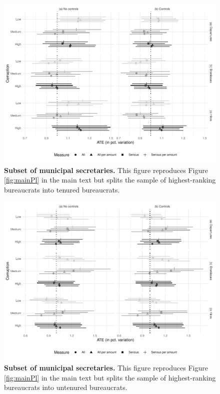 \documentclass[12pt,a4paper]{article}
\theoremstyle{definition}
\begin{document}
{\begin{figure}[H]
    \centering
    \includegraphics{figures/plSubsetTenured}
    \caption{{\bf Subset of municipal secretaries.} This figure reproduces Figure \ref{fig:mainPl} in the main text but splits the sample of highest-ranking bureaucrats into tenured bureaucrats.}
    \label{fig:plSubsetTenured}
\end{figure}

\begin{figure}[H]
    \centering
    \includegraphics{figures/plSubsetUntenured}
    \caption{{\bf Subset of municipal secretaries.} This figure reproduces Figure \ref{fig:mainPl} in the main text but splits the sample of highest-ranking bureaucrats into untenured bureaucrats.}
    \label{fig:plSubsetUntenured}
\end{figure}

}
\end{document}
